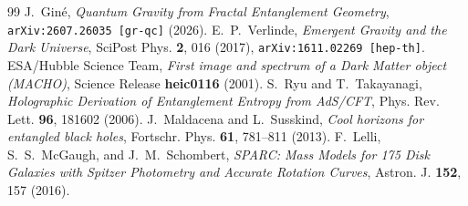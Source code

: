\documentclass[10pt,a4paper]{article}
\begin{document}
\begin{thebibliography}{99}\small\setlength{\itemsep}{1pt}
 J.~Gin\'e, \emph{Quantum Gravity from Fractal Entanglement Geometry}, \texttt{arXiv:2607.26035 [gr-qc]} (2026).
 E.~P.~Verlinde, \emph{Emergent Gravity and the Dark Universe}, SciPost Phys. \textbf{2}, 016 (2017), \texttt{arXiv:1611.02269 [hep-th]}.
 ESA/Hubble Science Team, \emph{First image and spectrum of a Dark Matter object (MACHO)}, Science Release \textbf{heic0116} (2001).
 S.~Ryu and T.~Takayanagi, \emph{Holographic Derivation of Entanglement Entropy from AdS/CFT}, Phys. Rev. Lett. \textbf{96}, 181602 (2006).
 J.~Maldacena and L.~Susskind, \emph{Cool horizons for entangled black holes}, Fortschr. Phys. \textbf{61}, 781--811 (2013).
 F.~Lelli, S.~S.~McGaugh, and J.~M.~Schombert, \emph{SPARC: Mass Models for 175 Disk Galaxies with Spitzer Photometry and Accurate Rotation Curves}, Astron. J. \textbf{152}, 157 (2016).
\end{thebibliography}
\end{document}
